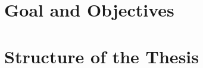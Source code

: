 \documentclass[a4paper, UKenglish, 11pt]{uiomaster}
\begin{document}
%
%
\section{Goal and Objectives}
\section{Structure of the Thesis}
\end{document}

